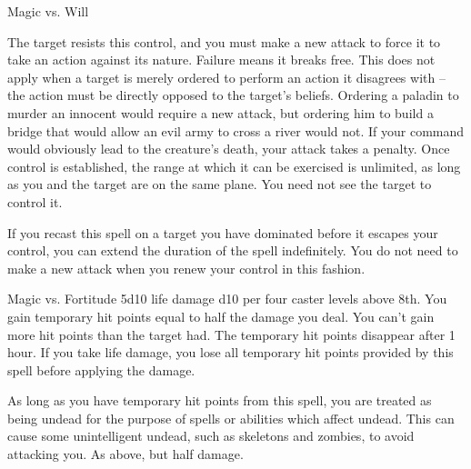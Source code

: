 \begin{spelleffects}
\begin{spellattack}{Magic vs. Will}
        \par The target resists this control, and you must make a new attack to force it to take an action against its nature. Failure means it breaks free. This does not apply when a target is merely ordered to perform an action it disagrees with -- the action must be directly opposed to the target's beliefs. Ordering a paladin to murder an innocent would require a new attack, but ordering him to build a bridge that would allow an evil army to cross a river would not. If your command would obviously lead to the creature's death, your attack takes a  penalty. Once control is established, the range at which it can be exercised is unlimited, as long as you and the target are on the same plane. You need not see the target to control it.
        \par If you recast this spell on a target you have dominated before it escapes your control, you can extend the duration of the spell indefinitely. You do not need to make a new attack when you renew your control in this fashion.
    \end{spellattack}
\end{spelleffects}
\begin{spellfooter}

\end{spellfooter}

\begin{spellheader}
    \spellrng{\rngclose}
    \spelldur{\durlong}
\end{spellheader}
\begin{spelleffects}
    \begin{spellattack}{Magic vs. Fortitude}
        \spellsuccess 5d10 life damage \add d10 per four caster levels above 8th. You gain temporary hit points equal to half the damage you deal. You can't gain more hit points than the target had. The temporary hit points disappear after 1 hour. If you take life damage, you lose all temporary hit points provided by this spell before applying the damage.

        As long as you have temporary hit points from this spell, you are treated as being undead for the purpose of spells or abilities which affect undead. This can cause some unintelligent undead, such as skeletons and zombies, to avoid attacking you.
        \spellfailure As above, but half damage.
    \end{spellattack}
\end{spelleffects}
\begin{spellfooter}

\end{spellfooter}

